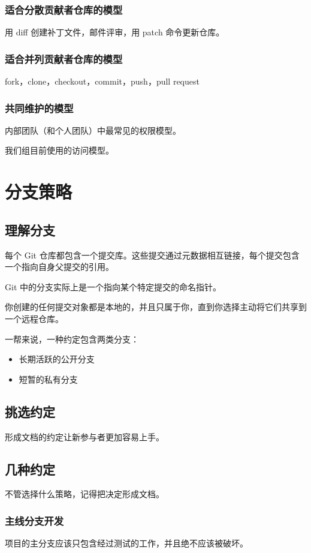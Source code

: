 \documentclass[cn,pad,11pt,green,geye]{../elegantnote}
\begin{document}
\subsubsection{适合分散贡献者仓库的模型}
用 diff 创建补丁文件，邮件评审，用 patch 命令更新仓库。

\subsubsection{适合并列贡献者仓库的模型}
fork，clone，checkout，commit，push，pull request

\subsubsection{共同维护的模型}
内部团队（和个人团队）中最常见的权限模型。

我们组目前使用的访问模型。

\section{分支策略}

\subsection{理解分支}
每个 Git 仓库都包含一个提交库。这些提交通过元数据相互链接，每个提交包含一个指向自身父提交的引用。

Git 中的分支实际上是一个指向某个特定提交的命名指针。

你创建的任何提交对象都是本地的，并且只属于你，直到你选择主动将它们共享到一个远程仓库。

一帮来说，一种约定包含两类分支：
\begin{itemize}
   \item 长期活跃的公开分支
   \item 短暂的私有分支
\end{itemize}

\subsection{挑选约定}
形成文档的约定让新参与者更加容易上手。

\subsection{几种约定}
不管选择什么策略，记得把决定形成文档。

\subsubsection{主线分支开发}
项目的主分支应该只包含经过测试的工作，并且绝不应该被破坏。
\end{document}
